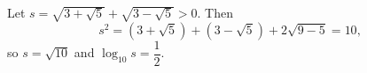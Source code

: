 Let $s=\sqrt{3+\sqrt5}+\sqrt{3-\sqrt5}>0$. Then
\[s^2=(3+\sqrt5)+(3-\sqrt5)+2\sqrt{9-5}=10,\]
so $s=\sqrt{10}$ and $\log_{10}s=\boxed{\dfrac12}$.

